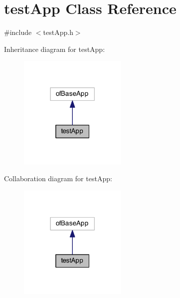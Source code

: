 \hypertarget{classtest_app}{\section{test\-App Class Reference}
\label{classtest_app}
}


{\ttfamily \#include $<$test\-App.\-h$>$}



Inheritance diagram for test\-App\-:
\nopagebreak
\begin{figure}[H]
\begin{center}
\leavevmode
\includegraphics[width=146pt]{classtest_app__inherit__graph}
\end{center}
\end{figure}


Collaboration diagram for test\-App\-:
\nopagebreak
\begin{figure}[H]
\begin{center}
\leavevmode
\includegraphics[width=146pt]{classtest_app__coll__graph}
\end{center}
\end{figure}
